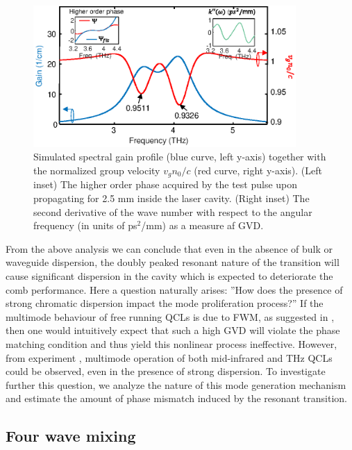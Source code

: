\documentclass[10pt,letterpaper]{article}%
\begin{document}
\begin{figure}[h]
\begin{center}
\includegraphics[width=10cm]{figs/THZtds.eps}
\end{center}
\caption{Simulated spectral gain profile (blue curve, left y-axis) together
with the normalized group velocity $v_{g}n_{0}/c$ (red curve, right y-axis).
(Left inset) The higher order phase acquired by the test pulse upon propagating
for 2.5 mm inside the laser cavity. (Right inset) The second derivative of the
wave number with respect to the angular frequency (in units of ps$^{2}$/mm) as
a measure af GVD. }%
\label{fig:img03}%
\end{figure}

From the above analysis we can conclude that even in the absence of bulk or
waveguide dispersion, the doubly peaked resonant nature of the transition will
cause significant dispersion in the cavity which is expected to deteriorate
the comb performance. Here a question naturally arises: ''How does the
presence of strong chromatic dispersion impact the mode proliferation
process?'' If the multimode behaviour of free running QCLs is due to FWM, as
suggested in \cite{friedli2013four,khurgin2014coherent}, then one would
intuitively expect that such a high GVD will violate the phase matching
condition and thus yield this nonlinear process ineffective. However, from
experiment \cite{burghoff2014terahertz,rosch2015octave}, multimode operation
of both mid-infrared and THz QCLs could be observed, even in the presence of
strong dispersion. To investigate further this question, we analyze the
nature of this mode generation mechanism and estimate the amount of phase
mismatch induced by the resonant transition.

\subsection{Four wave mixing}

\label{subsec:FWM}
\end{document}
